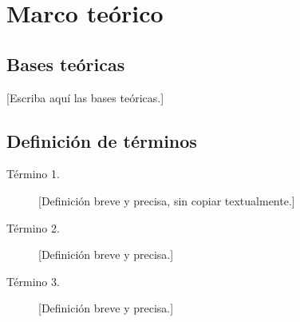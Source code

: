 \section{Marco teórico}

\subsection{Bases teóricas}
[Escriba aquí las bases teóricas.]

\subsection{Definición de términos}
\begin{description}
  \item[Término 1.] [Definición breve y precisa, sin copiar textualmente.]
  \item[Término 2.] [Definición breve y precisa.]
  \item[Término 3.] [Definición breve y precisa.]
\end{description}
